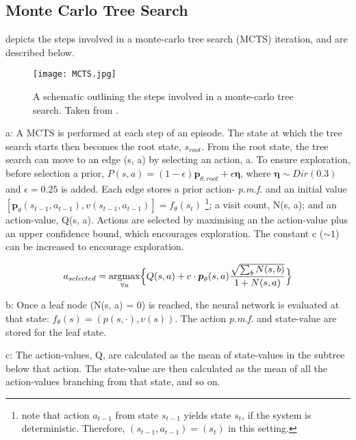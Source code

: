 \documentclass[../main.tex]{subfiles}
\begin{document}
\subsection{Monte Carlo Tree Search}
\label{sec:mctsintro}
 depicts the steps involved in a monte-carlo tree search (MCTS) iteration, and are described below.

\begin{figure}[H]
   \centering
   \texttt{[image: MCTS.jpg]}
   \caption{\label{fig:MCTS} A schematic outlining the steps involved in a monte-carlo tree search. Taken from \cite{AlphaGoZero}.}
\end{figure}

a:
A MCTS is performed at each step of an episode. The state at which the tree search starts then becomes the root state, $s_{root}$. From the root state, the tree search can move to an edge (s, a) by selecting an action, a. To ensure exploration, before selection a prior, $P(s, a) = (1-\epsilon)\boldsymbol{p}_{\theta, root} + \epsilon \boldsymbol{\eta}$, where $\boldsymbol{\eta} \sim Dir(0.3)$ and $\epsilon = 0.25$ is added. Each edge stores a prior action- \textit{p.m.f.} and an initial value $[\boldsymbol{p}_\theta (s_{t-1}, a_{t-1}), v(s_{t-1}, a_{t-1})] =f_\theta(s_t)$ \footnote{note that action $a_{t-1}$ from state $s_{t-1}$ yields state $s_t$, if the system is deterministic. Therefore, $(s_{t-1}, a_{t-1}) = (s_t)$ in this setting.}; a visit count, N(s, a); and an action-value, Q(s, a). Actions are selected by maximising an the action-value plus an upper confidence bound, which encourages exploration. The constant c ($\sim 1$) can be increased to encourage exploration.

\begin{equation}
   a_{selected} = \underset{\forall a}{\text{argmax}} \Big{\{}Q(s, a) + c \cdot\boldsymbol{p}_\theta (s, a)\frac{\sqrt{\sum_b N(s, b)}}{1 + N(s, a)}\Big{\}}
   \label{eqn:ucb}
\end{equation}

b:
Once a leaf node (N(s, a) = 0) is reached, the neural network is evaluated at that state: $f_\theta (s) = (p(s, \cdot), v(s))$. The action \textit{p.m.f.} and state-value are stored for the leaf state.

c:
The action-values, Q, are calculated as the mean of state-values in the subtree below that action. The state-value are then calculated as the mean of all the action-values branching from that state, and so on.
\end{document}

